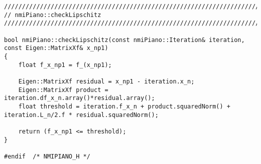 \documentclass[11pt]{article}
\begin{document}
\begin{lstlisting}
////////////////////////////////////////////////////////////////////////////////
// nmiPiano::checkLipschitz
////////////////////////////////////////////////////////////////////////////////

bool nmiPiano::checkLipschitz(const nmiPiano::Iteration& iteration, const Eigen::MatrixXf& x_np1)
{
    float f_x_np1 = f_(x_np1);
    
    Eigen::MatrixXf residual = x_np1 - iteration.x_n;
    Eigen::MatrixXf product = iteration.df_x_n.array()*residual.array();
    float threshold = iteration.f_x_n + product.squaredNorm() + iteration.L_n/2.f * residual.squaredNorm();
    
    return (f_x_np1 <= threshold);
}

#endif	/* NMIPIANO_H */
	\end{lstlisting}
\end{document}

